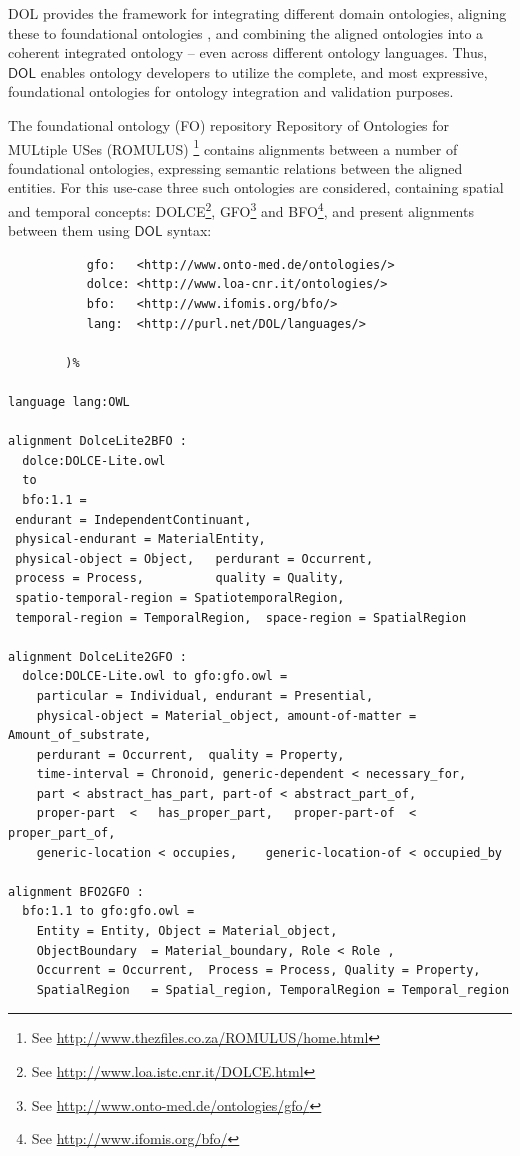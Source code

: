 \documentclass[10pt, a4paper]{isov2}
\newcommand*{\DOL}{\ensuremath{\mathsf{DOL}}\xspace}
\begin{document}
DOL  provides the framework for integrating different domain ontologies, aligning these to 
foundational ontologies \cite{DBLP:books/daglib/0032976},\cite{AlignmentAPI} and combining the aligned ontologies into a coherent 
integrated ontology -- even across different ontology languages. Thus, \DOL  enables ontology 
developers to utilize the complete, and most expressive, foundational ontologies for ontology 
integration and validation purposes. 

The foundational ontology (FO) repository Repository of Ontologies for MULtiple USes (ROMULUS) \footnote{See \url{http://www.thezfiles.co.za/ROMULUS/home.html}}
contains alignments between a number of foundational ontologies, expressing semantic relations between the aligned
entities.  For this use-case three such ontologies are considered, containing spatial and temporal concepts: DOLCE\footnote{See \url{http://www.loa.istc.cnr.it/DOLCE.html}}, GFO\footnote{See \url{http://www.onto-med.de/ontologies/gfo/}} and BFO\footnote{See \url{http://www.ifomis.org/bfo/}}, and present alignments between them 
using \DOL syntax:

\begin{lstlisting}[basicstyle=\ttfamily\footnotesize,language=dolText,escapechar=@,mathescape]
%prefix(
           gfo:   <http://www.onto-med.de/ontologies/>
           dolce: <http://www.loa-cnr.it/ontologies/>
           bfo:   <http://www.ifomis.org/bfo/>
           lang:  <http://purl.net/DOL/languages/>

        )%

language lang:OWL

alignment DolceLite2BFO :
  dolce:DOLCE-Lite.owl
  to
  bfo:1.1 =
 endurant = IndependentContinuant,
 physical-endurant = MaterialEntity,
 physical-object = Object,   perdurant = Occurrent,
 process = Process,          quality = Quality,
 spatio-temporal-region = SpatiotemporalRegion,
 temporal-region = TemporalRegion,  space-region = SpatialRegion

alignment DolceLite2GFO :
  dolce:DOLCE-Lite.owl to gfo:gfo.owl =
 	particular = Individual, endurant = Presential,
 	physical-object = Material_object, amount-of-matter = Amount_of_substrate,
 	perdurant = Occurrent, 	quality = Property,
 	time-interval = Chronoid, generic-dependent < necessary_for,
 	part < abstract_has_part, part-of < abstract_part_of,
 	proper-part  <	 has_proper_part,  	proper-part-of  < proper_part_of,
 	generic-location < occupies, 	generic-location-of < occupied_by

alignment BFO2GFO :
  bfo:1.1 to gfo:gfo.owl =
	Entity = Entity, Object = Material_object,
	ObjectBoundary  = Material_boundary, Role < Role ,
 	Occurrent = Occurrent, 	Process = Process, Quality = Property,
 	SpatialRegion 	= Spatial_region, TemporalRegion = Temporal_region 	
\end{lstlisting}
\end{document}
